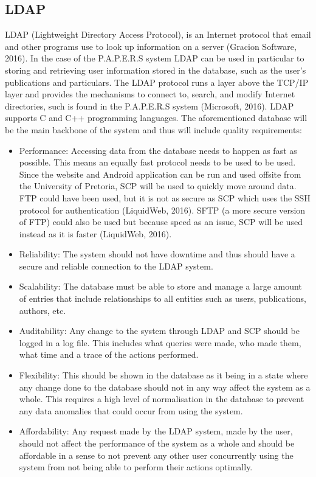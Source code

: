 \documentclass[12pt, letterpaper, twoside]{article}
\begin{document}
    \subsection{LDAP}
    LDAP (Lightweight Directory Access Protocol), is an Internet protocol that email and other programs use to look up information on a server (Gracion Software, 2016). In the case of the P.A.P.E.R.S system LDAP can be used in particular to storing and retrieving user information stored in the database, such as the user’s publications and particulars. The LDAP protocol runs a layer above the TCP/IP layer and provides the mechanisms to connect to, search, and modify Internet directories, such is found in the P.A.P.E.R.S system (Microsoft, 2016). LDAP supports C and C++ programming languages. The aforementioned database will be the main backbone of the system and thus will include quality requirements:
    \begin{itemize}  

        \item Performance: Accessing data from the database needs to happen as fast as possible. This means an equally fast protocol needs to be used to be used. Since the website and Android application can be run and used offsite from the University of Pretoria, SCP will be used to quickly move around data. FTP could have been used, but it is not as secure as SCP which uses the SSH protocol for authentication (LiquidWeb, 2016). SFTP (a more secure version of FTP) could also be used but because speed as an issue, SCP will be used instead as it is faster (LiquidWeb, 2016).
        \item Reliability: The system should not have downtime and thus should have a secure and reliable connection to the LDAP system.
        \item Scalability: The database must be able to store and manage a large amount of entries that include relationships to all entities such as users, publications, authors, etc. 
        \item Auditability: Any change to the system through LDAP and SCP should be logged in a log file. This includes what queries were made, who made them, what time and a trace of the actions performed.
        \item Flexibility: This should be shown in the database as it being in a state where any change done to the database should not in any way affect the system as a whole. This requires a high level of normalisation in the database to prevent any data anomalies that could occur from using the system.
        \item Affordability: Any request made by the LDAP system, made by the user, should not affect the performance of the system as a whole and should be affordable in a sense to not prevent any other user concurrently using the system from not being able to perform their actions optimally.
    \end{itemize}
\end{document}
